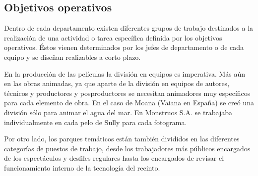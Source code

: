 \subsection{Objetivos operativos}
Dentro de cada departamento existen diferentes grupos de trabajo destinados a la realización de una actividad o tarea específica definida por los objetivos operativos. Éstos vienen determinados por los jefes de departamento o de cada equipo y se diseñan realizables a corto plazo.

En la producción de las películas la división en equipos es imperativa. Más aún en las obras animadas, ya que aparte de la división en equipos de autores, técnicos y productores y posproductores se necesitan animadores muy específicos para cada elemento de obra. En el caso de Moana (Vaiana en España) se creó una división sólo para animar el agua del mar. En Monstruos S.A. se trabajaba individualmente en cada pelo de Sully para cada fotograma.

Por otro lado, los parques temáticos están también divididos en las diferentes categorías de puestos de trabajo, desde los trabajadores más públicos encargados de los espectáculos y desfiles regulares hasta los encargados de revisar el funcionamiento interno de la tecnología del recinto.